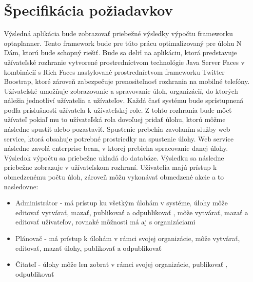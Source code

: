 \section{Špecifikácia požiadavkov}
Výsledná aplikácia bude zobrazovať priebežné výsledky výpočtu frameworku optaplanner. Tento framework bude pre túto prácu optimalizovaný pre úlohu N Dám, ktorú bude schopný riešiť. Bude sa deliť na aplikáciu, ktorá predstavuje užívateľské rozhranie vytvorené prostredníctvom technológie Java Server Faces v kombinácií s Rich Faces nastylované prostredníctvom frameworku Twitter Boostrap, ktoré zároveň zabezpečuje prenositeľnosť rozhrania na mobilné telefóny. Užívateľské umožňuje zobrazovanie a spravovanie úloh, organizácií, do ktorých náležia jednotliví užívatelia a užívateľov. Každá časť systému bude sprístupnená podľa príslušnosti užívatela k užívateľskej role. Z tohto rozhrania bude môcť užívateľ pokiaľ mu to užívateľská rola dovoľuej pridať úlohu, ktorú môžme následne spustiť alebo pozastaviť. Spustenie prebehia zavolaním služby web service, ktorá obsahuje potrebné prostriedky na spustenie úlohy. Web service následne zavolá enterprise bean, v ktorej prebieha spracovanie danej úlohy. Výsledok výpočtu sa priebežne ukladá do databáze. Výsledku sa následne priebežne zobrazuje v užívateľskom rozhraní. Užívatelia majú prístup k obmedzenému počtu úloh, zároveň môžu vykonávať obmedzené akcie a to nasledovne:
\begin{itemize}
\item Administrátor - má prístup ku všetkým úlohám v systéme, úlohy môže editovať vytvárať, mazať, publikovať a odpublikovať , môže vytvárať, mazať a editovať užívateľov, rovnaké môžnosti má aj s organizáciami
\item Plánovač - má prístup k úlohám v rámci svojej organizácie, môže vytvárať, editovať, mazať úlohy, publikovať a odpublikovať
\item Čitateľ - úlohy môže len zobrať v rámci svojej organizácie, publikovať , odpublikovať
\end{itemize}


